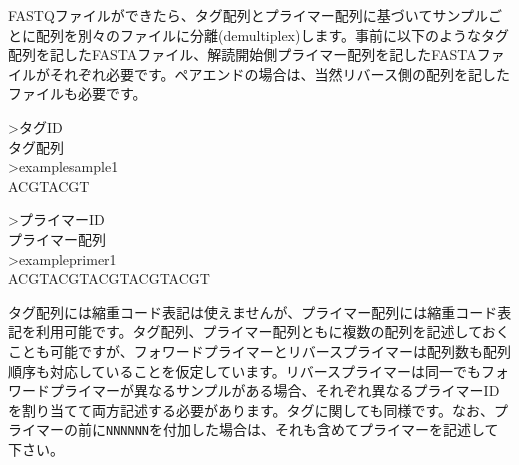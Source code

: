\documentclass[titlepage,10pt,a4paper,english]{jsbook}
\newenvironment{pre}{\begin{leftbar}\raggedright\ttfamily\footnotesize\setlength{\baselineskip}{1.4em}}{\end{leftbar}\vspace{-1em}}
\begin{document}
FASTQファイルができたら、タグ配列とプライマー配列に基づいてサンプルごとに配列を別々のファイルに分離(demultiplex)します。事前に以下のようなタグ配列を記したFASTAファイル、解読開始側プライマー配列を記したFASTAファイルがそれぞれ必要です。ペアエンドの場合は、当然リバース側の配列を記したファイルも必要です。
\begin{pre}
{\textgreater}タグID\\
タグ配列\\
{\textgreater}examplesample1\\
ACGTACGT
\end{pre}
\begin{pre}
{\textgreater}プライマーID\\
プライマー配列\\
{\textgreater}exampleprimer1\\
ACGTACGTACGTACGTACGT
\end{pre}
タグ配列には縮重コード表記は使えませんが、プライマー配列には縮重コード表記を利用可能です。タグ配列、プライマー配列ともに複数の配列を記述しておくことも可能ですが、フォワードプライマーとリバースプライマーは配列数も配列順序も対応していることを仮定しています。リバースプライマーは同一でもフォワードプライマーが異なるサンプルがある場合、それぞれ異なるプライマーIDを割り当てて両方記述する必要があります。タグに関しても同様です。なお、プライマーの前に\texttt{NNNNNN}を付加した場合は、それも含めてプライマーを記述して下さい。
\end{document}
